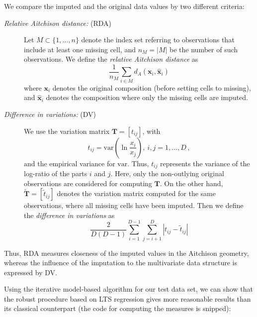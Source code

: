 \documentclass{scrartcl}\usepackage[]{graphicx}\usepackage[]{color}
\newcommand{\m}[1]{\ensuremath{\mathbf{#1}}}
\begin{document}
We compare the imputed and the original data values by two different
criteria:
\begin{description}
\item[{\it Relative Aitchison distance:} (RDA)]
Let $M\subset \{1,\ldots ,n\}$ denote the index set referring to observations
that include at least one missing cell, and $n_M=|M|$ be the number of such observations.
We define the {\it relative Aitchison distance} as
\begin{equation}
\label{relAitchison}
\frac{1}{n_M}\sum\limits_{i \in M} d_A(\m{x}_{i},\hat{\m{x}}_{i})
\end{equation}
where $\m{x}_{i}$ denotes the original composition (before setting cells to
missing), and $\hat{\m{x}}_{i}$ denotes the composition where only the missing
cells are imputed. 

\item[{\it Difference in variations:} (DV)]
We use the variation matrix $\m{T}=[t_{ij}]$, with
\begin{displaymath}
\label{variation}
t_{ij}=\mathrm{var}\left(\ln\frac{x_i}{x_j}\right),\ i,j=1,\dots,D\,,
\end{displaymath}
and the empirical variance for $\mathrm{var}$.
Thus, $t_{ij}$ represents the variance of the log-ratio of the parts 
$i$ and $j$. Here, only the non-outlying original observations
are considered for computing $\m{T}$. 
On the other hand, 
$\tilde{\m{T}}=[\tilde{t}_{ij}]$
denotes the variation matrix computed for the same observations,
where all missing cells have been imputed.
Then we define the {\it difference in variations} as
\begin{equation}
\label{diffvariation}
\frac{2}{D(D-1)}
\sum\limits_{i=1}^{D-1}
\sum\limits_{j=i+1}^{D}
|t_{ij} - \tilde{t}_{ij}|
\end{equation}
\end{description}
Thus, RDA measures closeness of the imputed
values in the Aitchison geometry, whereas the influence of the imputation
to the multivariate data structure is expressed by DV.

Using the iterative model-based algorithm for our test data set,
we can show that the robust procedure based on LTS regression
gives more reasonable results than its classical counterpart
(the code for computing the measures is snipped):

\end{document}
